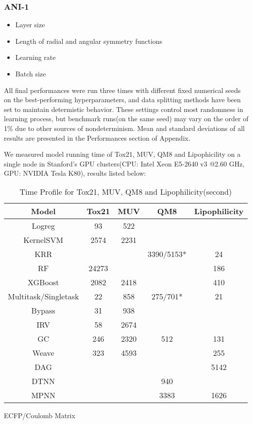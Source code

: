 \subsubsection{ANI-1}
\begin{itemize}
    \item Layer size
    \item Length of radial and angular symmetry functions
    \item Learning rate
    \item Batch size
\end{itemize}

All final performances were run three times with different fixed numerical seeds on the best-performing hyperparameters, and data splitting methods have been set to maintain determistic behavior. These settings control most randomness in learning process, but benchmark runs(on the same seed) may vary on the order of 1\% due to other sources of nondeterminism. Mean and standard deviations of all results are presented in the Performances section of Appendix.

We measured model running time of Tox21, MUV, QM8 and Lipophicility on a single node in Stanford's GPU clusters(CPU: Intel Xeon E5-2640 v3 @2.60 GHz, GPU: NVIDIA Tesla K80), results listed below:
\begin{table}[H]
    \small
    \centering
    \begin{threeparttable}
    \caption{Time Profile for Tox21, MUV, QM8 and Lipophilicity(second)}
    \begin{tabular}{ |c|c|c|c|c| } 
    \hline
    \textbf{Model} & \textbf{Tox21} & \textbf{MUV} & \textbf{QM8} & \textbf{Lipophilicity} \\
    \hline
    \hline
    Logreg & 93 & 522 & &\\
    \hline
    KernelSVM & 2574 & 2231 & & \\
    \hline
    KRR & & & 3390/5153* & 24\\
    \hline
    RF & 24273 & & & 186\\
    \hline
    XGBoost & 2082 & 2418 & & 410\\
    \hline
    Multitask/Singletask & 22 & 858 & 275/701* & 21\\
    \hline
    Bypass & 31 & 938 & &\\
    \hline
    IRV & 58 & 2674 & &\\
    \hline
    GC & 246 & 2320 & 512 & 131\\
    \hline
    Weave & 323 & 4593 & & 255\\
    \hline
    DAG & & & & 5142\\
    \hline
    DTNN & & & 940 &\\
    \hline
    MPNN & & & 3383 & 1626\\
    \hline
    \end{tabular}
    \label{tab:running_time}
    \begin{tablenotes}
        \item * ECFP/Coulomb Matrix
    \end{tablenotes}
    \end{threeparttable}
\end{table}

